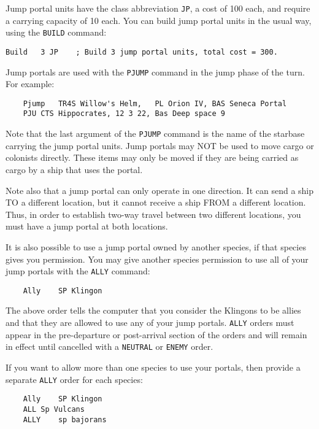 \documentclass[10pt,titlepage]{article}
\begin{document}
Jump portal units have the class abbreviation \texttt{JP}, a cost of 100 each, and
require a carrying capacity of 10 each.  You can build jump portal units
in the usual way, using the \texttt{BUILD} command:

\begin{verbatim}
Build	3 JP	; Build 3 jump portal units, total cost = 300.	\end{verbatim} 

Jump portals are used with the \texttt{PJUMP} command in the jump phase of the turn.
For example:

\begin{verbatim}
	Pjump   TR4S Willow's Helm,   PL Orion IV, BAS Seneca Portal
	PJU	CTS Hippocrates, 12 3 22, Bas Deep space 9\end{verbatim} 

Note that the last argument of the \texttt{PJUMP} command is the name of the starbase
carrying the jump portal units.  Jump portals may NOT be used to move cargo or
colonists directly.  These items may only be moved if they are being carried
as cargo by a ship that uses the portal.

Note also that a jump portal can only operate in one direction.  It can send
a ship TO a different location, but it cannot receive a ship FROM a different
location.  Thus, in order to establish two-way travel between two different
locations, you must have a jump portal at both locations.

It is also possible to use a jump portal owned by another species, if that
species gives you permission.  You may give another species permission to
use all of your jump portals with the \texttt{ALLY} command:

\begin{verbatim}
	Ally	SP Klingon\end{verbatim} 

The above order tells the computer that you consider the Klingons to be allies
and that they are allowed to use any of your jump portals.  \texttt{ALLY} orders must
appear in the pre-departure or post-arrival section of the orders and will
remain in effect until cancelled with a \texttt{NEUTRAL} or \texttt{ENEMY} order.

If you want to allow more than one species to use your portals, then provide
a separate \texttt{ALLY} order for each species:

\begin{verbatim}
	Ally	SP Klingon
	ALL	Sp Vulcans
	ALLY	sp bajorans\end{verbatim} 
\end{document}
